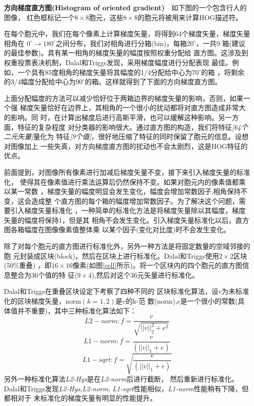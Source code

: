 \textbf{方向梯度直方图(Histogram of oriented gradient)}~~如下图的一个包含行人的图像，
红色框标记一个$8\times8$胞元，这些$8\times8$的胞元将被用来计算HOG描述符。


在每个胞元中，我们在每个像素上计算梯度矢量，将得到64个梯度矢量，梯度矢量相角在
$0^\circ\to180^\circ$之间分布，我们对相角进行分箱(bin)，每箱$20^\circ$，一共9
箱(\cite{DT2005}建议的最佳参数)。具有某一相角的梯度矢量的幅度按照权重分配给
直方图。这涉及到权重投票表决机制，Dalal和Triggs发现，采用梯度幅度进行分配表现
最佳。例如，一个具有85度相角的梯度矢量将其幅度的1/4分配给中心为$70^\circ$的箱
，将剩余的3/4幅度分配给中心为$90^\circ$的箱。这样就得到了下面的方向梯度直方图。


上面分配幅度的方法可以减少恰好位于两箱边界的梯度矢量的影响，否则，如果一个强
梯度矢量恰好在边界上，其相角的一个很小的扰动都将对直方图造成非常大的影响。同
时，在计算出梯度后进行高斯平滑，也可以缓解这种影响。另一方面，特征的复杂程度
对分类器的影响很大。通过直方图的构造，我们将特征\textit{[64个二元矢量]}量化为
特征\textit{[9个值]}，很好地压缩了特征的同时保留了胞元的信息。设想对图像加上
一些失真，对方向梯度直方图的扰动也不会太剧烈，这是HOG特征的优点。

前面提到，对图像所有像素进行加减后梯度矢量不变，接下来引入梯度矢量的标准化，
使得其在像素值进行乘法运算后仍然保持不变。如果对胞元内的像素值都乘以某一常数
，梯度矢量的幅度明显会发生变化，幅度会增加常数因子,相角保持不变，这会造成整
个直方图的每个箱的幅度增加常数因子。为了解决这个问题，需要引入梯度矢量标准化
，一种简单的标准化方法是将梯度矢量除以其幅度，梯度矢量的幅度将保持1，但是其
相角不会发生变化。引入梯度矢量标准化以后，直方图各箱幅度在图像像素值整体乘
以某个因子(变化对比度)时不会发生变化。

除了对每个胞元的直方图进行标准化外，另外一种方法是将固定数量的空域邻接的胞
元封装成区块(block)，然后在区块上进行标准化。Dalal和Triggs使用$2\times2$区块(50\%重叠)
，即$16\times16$像素(如图\ref{cell}所示)。将一个区块内的四个胞元的直方图信息整合为36个值的特
征($9\times4$),然后对这个36元矢量进行标准化。


Dalal和Triggs在重叠区块设定下考察了四种不同的
区块标准化算法，设$v$为未标准化的区块梯度矢量，\gls{norm}$(k=1,2)$是$v$的k-范
数(norm),$e$是一个很小的常数(具体值并不重要)，其中三种标准化算法如下：
\begin{equation}
L2-norm:f=\frac{v}{\sqrt{||v||^2_2+e^2}}
\end{equation}
\begin{equation}
L1-norm:f=\frac{v}{(||v||_1+e)}
\end{equation}
\begin{equation}
L1-sqrt:f=\sqrt{\frac{v}{(||v||_1+e)}}
\end{equation}
另外一种标准化算法\textit{L2-Hys}是在\textit{L2-norm}后进行截断，
然后重新进行标准化。Dalal和Triggs发现\textit{L2-Hys},\textit{L2-norm},
\textit{L1-sqrt}性能相似，\textit{L1-norm}性能稍有下降，但都相对于
未标准化的梯度矢量有明显的性能提升。

